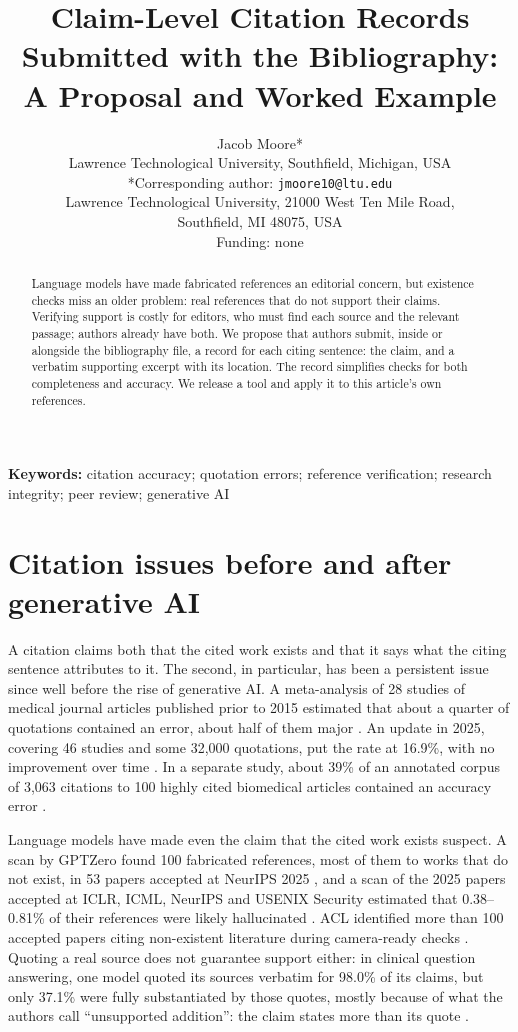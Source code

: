 \documentclass[11pt]{article}
\title{Claim-Level Citation Records Submitted with the Bibliography:\\A Proposal and Worked Example}
\author{Jacob Moore*\\Lawrence Technological University, Southfield, Michigan, USA\\[1ex]*Corresponding author: \texttt{jmoore10@ltu.edu}\\Lawrence Technological University, 21000 West Ten Mile Road,\\Southfield, MI 48075, USA\\[1ex]Funding: none}
\date{}
\begin{document}
\maketitle

\begin{abstract}
Language models have made fabricated references an editorial concern, but existence checks miss an older problem: real references that do not support their claims. Verifying support is costly for editors, who must find each source and the relevant passage; authors already have both. We propose that authors submit, inside or alongside the bibliography file, a record for each citing sentence: the claim, and a verbatim supporting excerpt with its location. The record simplifies checks for both completeness and accuracy. We release a tool and apply it to this article's own references.
\end{abstract}

\noindent\textbf{Keywords:} citation accuracy; quotation errors; reference verification; research integrity; peer review; generative AI

\section{Citation issues before and after generative AI}

A citation claims both that the cited work exists and that it says what the citing sentence attributes to it. The second, in particular, has been a persistent issue since well before the rise of generative AI. A meta-analysis of 28 studies of medical journal articles published prior to 2015 estimated that about a quarter of quotations contained an error, about half of them major \citep{jergas2015quotation}. An update in 2025, covering 46 studies and some 32,000 quotations, put the rate at 16.9\%, with no improvement over time \citep{baethge2025quotation}. In a separate study, about 39\% of an annotated corpus of 3,063 citations to 100 highly cited biomedical articles contained an accuracy error \citep{sarol2024citationintegrity}.

Language models have made even the claim that the cited work exists suspect. A scan by GPTZero found 100 fabricated references, most of them to works that do not exist, in 53 papers accepted at NeurIPS 2025 \citep{ansari2026compound}, and a scan of the 2025 papers accepted at ICLR, ICML, NeurIPS and USENIX Security estimated that 0.38--0.81\% of their references were likely hallucinated \citep{russinovich2026phantom}. ACL identified more than 100 accepted papers citing non-existent literature during camera-ready checks \citep{acl2026statement}. Quoting a real source does not guarantee support either: in clinical question answering, one model quoted its sources verbatim for 98.0\% of its claims, but only 37.1\% were fully substantiated by those quotes, mostly because of what the authors call ``unsupported addition'': the claim states more than its quote \citep{zhang2026verifiable}.
\end{document}
